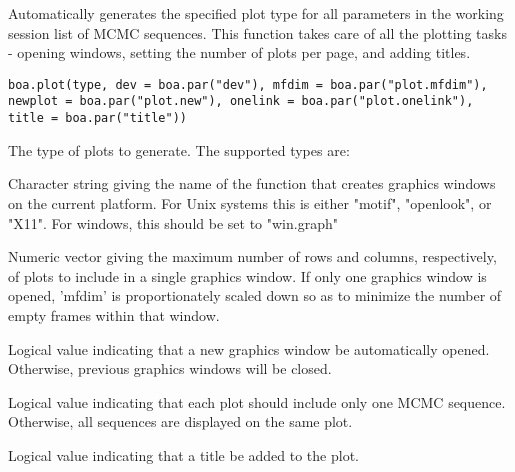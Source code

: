 \begin{Description}\relax
Automatically generates the specified plot type for all parameters in the 
working session list of MCMC sequences. This function takes care of all the 
plotting tasks - opening windows, setting the number of plots per page, and 
adding titles.
\end{Description}
\begin{Usage}
\begin{verbatim}
boa.plot(type, dev = boa.par("dev"), mfdim = boa.par("plot.mfdim"),
newplot = boa.par("plot.new"), onelink = boa.par("plot.onelink"),
title = boa.par("title"))
\end{verbatim}
\end{Usage}
\begin{Arguments}
\begin{ldescription}
\item[\code{type}] The type of plots to generate. The supported types are:
\item[\code{dev}] Character string giving the name of the function that creates 
graphics windows on the current platform. For Unix systems this is either 
"motif", "openlook", or "X11". For windows, this should be set to "win.graph"
\item[\code{mfdim}] Numeric vector giving the maximum number of rows and columns, 
respectively, of plots to include in a single graphics window. If only one 
graphics window is opened, 'mfdim' is proportionately scaled down so as to 
minimize the number of empty frames within that window.
\item[\code{newplot}] Logical value indicating that a new graphics window be 
automatically opened. Otherwise, previous graphics windows will be closed.
\item[\code{onelink}] Logical value indicating that each plot should include only 
one MCMC sequence. Otherwise, all sequences are displayed on the same plot.
\item[\code{title}] Logical value indicating that a title be added to the plot.
\end{ldescription}
\end{Arguments}
